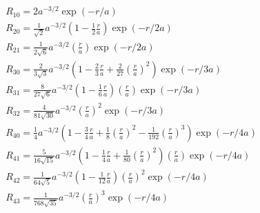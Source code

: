 \begin{align*}
     & R_{10} = 2a^{-3/2}\exp(-r/a)                                                                                                                              \\[1.5em]
     & R_{20} = \frac{1}{\sqrt{2}}a^{-3/2}\left(1-\frac12\frac ra\right)\exp(-r/2a)                                                                              \\
     & R_{21} = \frac{1}{2\sqrt{6}}a^{-3/2}\left(\frac ra\right)\exp(-r/2a)                                                                                      \\[1.5em]
     & R_{30} = \frac{2}{3\sqrt{3}}a^{-3/2}\left(1-\frac23\frac ra+\frac2{27}{\left(\frac ra\right)}^2\right)\exp(-r/3a)                                         \\
     & R_{31} = \frac{8}{27\sqrt{6}}a^{-3/2}\left(1-\frac16\frac ra\right)\left(\frac ra\right)\exp(-r/3a)                                                       \\
     & R_{32} = \frac{4}{81\sqrt{30}}a^{-3/2}{\left(\frac ra\right)}^2\exp(-r/3a)                                                                                \\[1.5em]
     & R_{40} = \frac{1}{4} a^{-3/2}\left(1-\frac34\frac ra+\frac18{\left(\frac ra\right)}^2-\frac1{192}{\left(\frac ra\right)}^3\right)\exp(-r/4a)              \\
     & R_{41} = \frac{5}{16\sqrt{15}}a^{-3/2}\left(1-\frac{1}{4}\frac{r}{a}+\frac{1}{80}{\left(\frac{r}{a}\right)}^{2}\right)\left(\frac{r}{a}\right)\exp(-r/4a) \\
     & R_{42} = \frac{1}{64\sqrt{5}}a^{-3/2}\left(1-\frac1{12}\frac ra\right){\left(\frac ra\right)}^2\exp(-r/4a)                                                \\
     & R_{43} = \frac{1}{768\sqrt{35}}a^{-3/2}{\left(\frac ra\right)}^3\exp(-r/4a)
\end{align*}